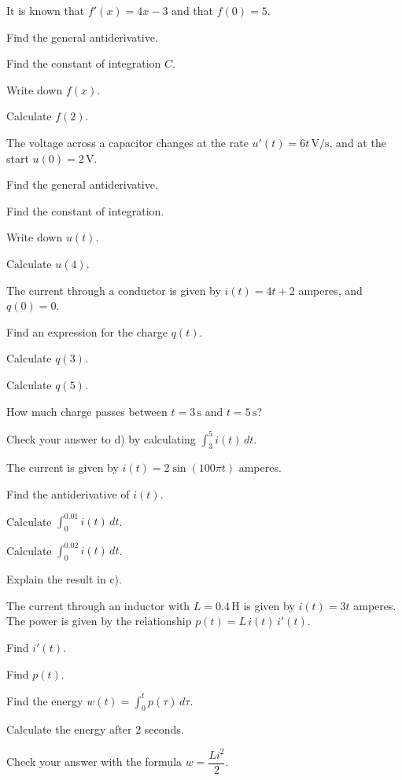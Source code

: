 It is known that $f'(x) = 4x - 3$ and that $f(0) = 5$.
\begin{parts}
  \item Find the general antiderivative.
  \item Find the constant of integration $C$.
  \item Write down $f(x)$.
  \item Calculate $f(2)$.
\end{parts}

The voltage across a capacitor changes at the rate $u'(t) = 6t\,\text{V/s}$, and at the start
$u(0) = 2\,\text{V}$.
\begin{parts}
  \item Find the general antiderivative.
  \item Find the constant of integration.
  \item Write down $u(t)$.
  \item Calculate $u(4)$.
\end{parts}

The current through a conductor is given by $i(t) = 4t + 2$ amperes, and $q(0) = 0$.
\begin{parts}
  \item Find an expression for the charge $q(t)$.
  \item Calculate $q(3)$.
  \item Calculate $q(5)$.
  \item How much charge passes between $t = 3\,\text{s}$ and $t = 5\,\text{s}$?
  \item Check your answer to d) by calculating $\displaystyle\int_3^5 i(t)\,dt$.
\end{parts}

The current is given by $i(t) = 2\sin(100\pi t)$ amperes.
\begin{parts}
  \item Find the antiderivative of $i(t)$.
  \item Calculate $\displaystyle\int_0^{0.01} i(t)\,dt$.
  \item Calculate $\displaystyle\int_0^{0.02} i(t)\,dt$.
  \item Explain the result in c).
\end{parts}

The current through an inductor with $L = 0.4\,\text{H}$ is given by $i(t) = 3t$ amperes. The
power is given by the relationship $p(t) = L\,i(t)\,i'(t)$.
\begin{parts}
  \item Find $i'(t)$.
  \item Find $p(t)$.
  \item Find the energy $w(t) = \displaystyle\int_0^t p(\tau)\,d\tau$.
  \item Calculate the energy after $2$ seconds.
  \item Check your answer with the formula $w = \dfrac{Li^2}{2}$.
\end{parts}

